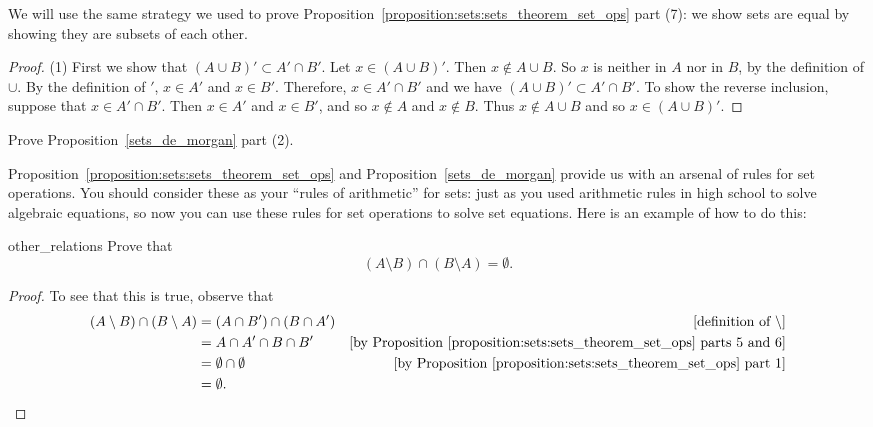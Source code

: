  We will use the same strategy we used to prove Proposition~\ref{proposition:sets:sets_theorem_set_ops} part (7): we show sets are equal by showing they are subsets of each other.
\medskip{}

\begin{proof} 

\noindent
(1)
First we show that $(A \cup B)' \subset A' \cap B'$.  Let $x \in (A \cup B)'$.  Then $x \notin A \cup B$. So $x$ is neither in $A$ nor in $B$, by the definition of $\cup$.  By the definition of $'$, $x \in A'$ and $x \in B'$.  Therefore, $x \in A' \cap B'$ and we have $(A \cup B)' \subset A' \cap B'$.
 To show the reverse inclusion, suppose that $x \in A' \cap B'$.  Then $x \in A'$ and $x \in B'$, and so $x \notin A$ and $x \notin B$.  Thus $x \notin A \cup B$ and so $x \in (A \cup B)'$.  
\end{proof}

\begin{exercise}{}
Prove Proposition~\ref{sets_de_morgan} part (2).
\end{exercise}
 
\medskip{}
\noindent
Proposition~\ref{proposition:sets:sets_theorem_set_ops} and Proposition~\ref{sets_de_morgan} provide us with an arsenal of rules for set operations. You should consider these as your ``rules of arithmetic'' for sets: just as you used arithmetic rules in high school to solve algebraic equations, so now you can use these rules for set operations to solve set equations.  Here is an example of how to do this:

\begin{example}{other_relations}
Prove that
\[
( A \setminus B) \cap (B \setminus A) = \emptyset.
\]

\begin{proof}
To see that this is true, observe that
\begin{align*}
( A \setminus B) \cap (B \setminus A)
& =
( A \cap B') \cap (B \cap A')   & \mbox{[definition of } \setminus] \\
& =
A \cap A' \cap B \cap B'    &\mbox{[by Proposition~\ref{proposition:sets:sets_theorem_set_ops} parts 5 and 6]} \\
&= \emptyset \cap \emptyset    &\mbox{[by Proposition~\ref{proposition:sets:sets_theorem_set_ops} part 1]} \\
& = \emptyset. \\
\end{align*}
\end{proof}
\end{example}


